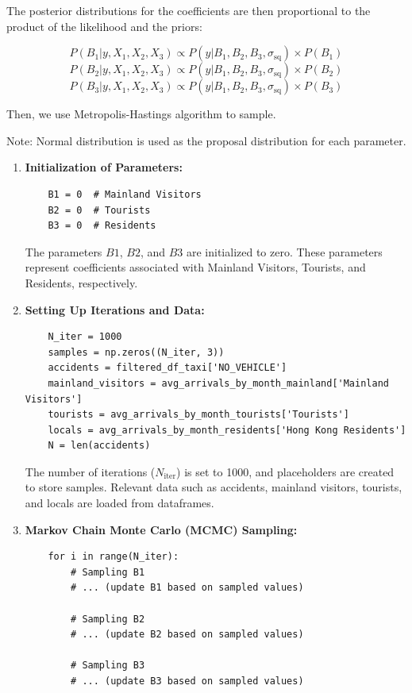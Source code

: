 \documentclass{article}
\begin{document}
The posterior distributions for the coefficients are then proportional to the product of the likelihood and the priors:

\[
P(B_1 | y, X_1, X_2, X_3) \propto P(y | B_1, B_2, B_3, \sigma_{\text{sq}}) \times P(B_1)
\]
\[
P(B_2 | y, X_1, X_2, X_3) \propto P(y | B_1, B_2, B_3, \sigma_{\text{sq}}) \times P(B_2)
\]
\[
P(B_3 | y, X_1, X_2, X_3) \propto P(y | B_1, B_2, B_3, \sigma_{\text{sq}}) \times P(B_3)
\]

Then, we use Metropolis-Hastings algorithm to sample. 

Note: Normal distribution is used as the proposal distribution for each parameter.
\newpage
\begin{enumerate}[label=\arabic*.]
    \item \textbf{Initialization of Parameters:}
    \begin{lstlisting}
    B1 = 0  # Mainland Visitors
    B2 = 0  # Tourists
    B3 = 0  # Residents
    \end{lstlisting}
    
    The parameters \(B1\), \(B2\), and \(B3\) are initialized to zero. These parameters represent coefficients associated with Mainland Visitors, Tourists, and Residents, respectively.

    \item \textbf{Setting Up Iterations and Data:}
    \begin{lstlisting}
    N_iter = 1000
    samples = np.zeros((N_iter, 3))
    accidents = filtered_df_taxi['NO_VEHICLE']
    mainland_visitors = avg_arrivals_by_month_mainland['Mainland Visitors']
    tourists = avg_arrivals_by_month_tourists['Tourists']
    locals = avg_arrivals_by_month_residents['Hong Kong Residents']
    N = len(accidents)
    \end{lstlisting}
    
    The number of iterations (\(N_{\text{iter}}\)) is set to 1000, and placeholders are created to store samples. Relevant data such as accidents, mainland visitors, tourists, and locals are loaded from dataframes.

    \item \textbf{Markov Chain Monte Carlo (MCMC) Sampling:}
    \begin{lstlisting}
    for i in range(N_iter):
        # Sampling B1
        # ... (update B1 based on sampled values)

        # Sampling B2
        # ... (update B2 based on sampled values)

        # Sampling B3
        # ... (update B3 based on sampled values)


\end{lstlisting}
\end{enumerate}
\end{document}

